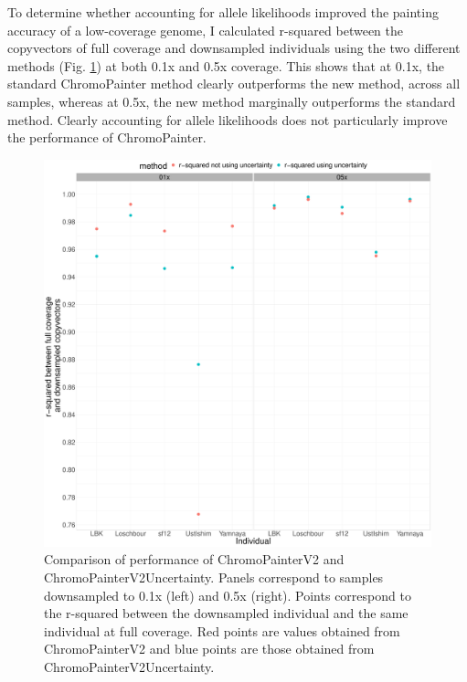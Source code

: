 To determine whether accounting for allele likelihoods improved the painting accuracy of a low-coverage genome, I calculated r-squared between the copyvectors of full coverage and downsampled individuals using the two different methods (Fig. \ref{fig:uncertainty_v_noUncertainty_0.5x_0.1x}) at both 0.1x and 0.5x coverage. This shows that at 0.1x, the standard ChromoPainter method clearly outperforms the new method, across all samples, whereas at 0.5x, the new method marginally outperforms the standard method. Clearly accounting for allele likelihoods does not particularly improve the performance of ChromoPainter.


\begin{figure}[htp]
    \centering
    \includegraphics[width=1.0\textwidth]{../images/chapter1/uncertainty_v_noUncertainty_0.5x_0.1x.pdf}
    \caption{Comparison of performance of ChromoPainterV2 and ChromoPainterV2Uncertainty. Panels correspond to samples downsampled to 0.1x (left) and 0.5x (right). Points correspond to the r-squared between the downsampled individual and the same individual at full coverage. Red points are values obtained from ChromoPainterV2 and blue points are those obtained from ChromoPainterV2Uncertainty.}
    \label{fig:uncertainty_v_noUncertainty_0.5x_0.1x}
\end{figure}


